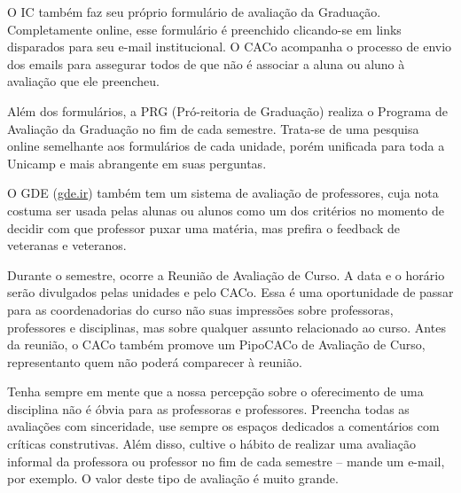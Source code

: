 O IC também faz seu próprio formulário de avaliação da Graduação. Completamente
online, esse formulário é preenchido clicando-se em links disparados para seu
e-mail institucional. O CACo acompanha o processo de envio dos emails para
assegurar todos de que não é associar a aluna ou aluno à avaliação que ele
preencheu.

Além dos formulários, a PRG (Pró-reitoria de Graduação) realiza o Programa de
Avaliação da Graduação no fim de cada semestre. Trata-se de uma pesquisa
online semelhante aos formulários de cada unidade, porém unificada para toda a
Unicamp e mais abrangente em suas perguntas.

O GDE (\url{gde.ir}) também tem um sistema de avaliação de professores, cuja
nota costuma ser usada pelas alunas ou alunos como um dos critérios no momento
de decidir com que professor puxar uma matéria, mas prefira o feedback de
veteranas e veteranos.

Durante o semestre, ocorre a Reunião de Avaliação de Curso. A data e o horário
serão divulgados pelas unidades e pelo CACo. Essa é uma oportunidade de passar
para as coordenadorias do curso não suas impressões sobre professoras,
professores e disciplinas, mas sobre qualquer assunto relacionado ao curso.
Antes da reunião, o CACo também promove um PipoCACo de Avaliação de Curso,
representanto quem não poderá comparecer à reunião.

Tenha sempre em mente que a nossa percepção sobre o oferecimento de uma
disciplina não é óbvia para as professoras e professores. Preencha todas as
avaliações com sinceridade, use sempre os espaços dedicados a comentários com
críticas construtivas. Além disso, cultive o hábito de realizar uma avaliação
informal da professora ou professor no fim de cada semestre -- mande um e-mail,
por exemplo. O valor deste tipo de avaliação é muito grande.
